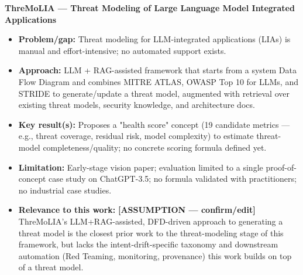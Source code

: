 \documentclass[a4paper,12pt]{report}
\begin{document}
\textbf{ThreMoLIA — Threat Modeling of Large Language Model Integrated Applications}
\begin{itemize}
    \item \textbf{Problem/gap:} Threat modeling for LLM-integrated applications (LIAs) is manual and effort-intensive; no automated support exists.
    
    \item \textbf{Approach:} LLM + RAG-assisted framework that starts from a system Data Flow Diagram and combines MITRE ATLAS, OWASP Top 10 for LLMs, and STRIDE to generate/update a threat model, augmented with retrieval over existing threat models, security knowledge, and architecture docs.
    
    \item \textbf{Key result(s):} Proposes a "health score" concept (19 candidate metrics — e.g., threat coverage, residual risk, model complexity) to estimate threat-model completeness/quality; no concrete scoring formula defined yet.
    
    \item \textbf{Limitation:} Early-stage vision paper; evaluation limited to a single proof-of-concept case study on ChatGPT-3.5; no formula validated with practitioners; no industrial case studies.
    
    \item \textbf{Relevance to this work:} \textbf{[ASSUMPTION — confirm/edit]} ThreMoLIA's LLM+RAG-assisted, DFD-driven approach to generating a threat model is the closest prior work to the threat-modeling stage of this framework, but lacks the intent-drift-specific taxonomy and downstream automation (Red Teaming, monitoring, provenance) this work builds on top of a threat model.
\end{itemize}
\end{document}
